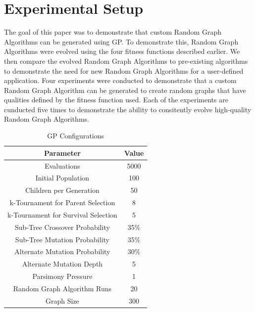 \documentclass{article}
\begin{document}
\section{Experimental Setup}
The goal of this paper was to demonstrate that custom Random Graph Algorithms can be generated using GP. To demonstrate this, Random Graph Algorithms were evolved
using the four fitness functions described earlier. We then compare the evolved Random Graph Algorithms to pre-existing algorithms to demonstrate the need for new
Random Graph Algorithms for a user-defined application. Four experiments were conducted to demonstrate that a custom Random Graph Algorithm can be generated to 
create random graphs that have qualities defined by the fitness function used. Each of the experiments are cunducted five times to demonstrate the ability to 
consitently evolve high-quality Random Graph Algorithms.

\begin{table}
    \begin{center}
    \begin{tabular}{|c|c|}
        \hline
        \textbf{Parameter} &\textbf{Value}\\ \hline
        Evaluations&5000\\ \hline
        Initial Population&100\\ \hline
        Children per Generation&50\\ \hline
        k-Tournament for Parent Selection&8\\ \hline
        k-Tournament for Survival Selection&5\\ \hline
	    Sub-Tree Crossover Probability& 35\% \\ \hline
	    Sub-Tree Mutation Probability& 35\% \\ \hline
	    Alternate Mutation Probability& 30\% \\ \hline
	    Alternate Mutation Depth& 5\\ \hline
	    Parsimony Pressure & 1\\ \hline
        Random Graph Algorithm Runs&20\\ \hline
        Graph Size&300\\ \hline
    \end{tabular}
    \end{center}
\caption{GP Configurations}
  \label{tab:GP}
\end{table}
\end{document}

